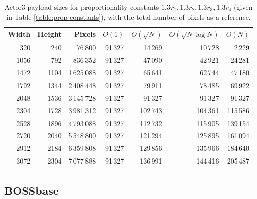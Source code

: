 \documentclass[11pt,a4paper,twoside,openright]{report}
\begin{document}
\begin{appendices}
\begin{table}[htbp]
\begin{center}
\begin{tabular}{ | r r | r | r r r r | }
\hline
Width & Height & Pixels & $O(1)$ & $O(\sqrt{N})$ & $O(\sqrt{N} \log N)$ & $O(N)$ \\ \hline
320 & 240 & 76\,800 & 91\,327 & 14\,269 & 10\,728 & 2\,229 \\
1056 & 792 & 836\,352 & 91\,327 & 47\,090 & 42\,921 & 24\,281 \\
1472 & 1104 & 1\,625\,088 & 91\,327 & 65\,641 & 62\,744 & 47\,180 \\
1792 & 1344 & 2\,408\,448 & 91\,327 & 79\,911 & 78\,485 & 69\,922 \\
2048 & 1536 & 3\,145\,728 & 91\,327 & 91\,327 & 91\,327 & 91\,327 \\
2304 & 1728 & 3\,981\,312 & 91\,327 & 102\,743 & 104\,361 & 115\,586 \\
2528 & 1896 & 4\,793\,088 & 91\,327 & 112\,732 & 115\,905 & 139\,154 \\
2720 & 2040 & 5\,548\,800 & 91\,327 & 121\,294 & 125\,895 & 161\,094 \\
2912 & 2184 & 6\,359\,808 & 91\,327 & 129\,856 & 135\,966 & 184\,640 \\
3072 & 2304 & 7\,077\,888 & 91\,327 & 136\,991 & 144\,416 & 205\,487 \\ \hline
\end{tabular}
\caption{Actor3 payload sizes for proportionality constants $1.3 r_1, 1.3 r_2, 1.3 r_3, 1.3 r_4$ (given in Table \ref{table:prop-constants}), with the total number of pixels as a reference.}
\end{center}
\end{table}


\subsection{BOSSbase}


\end{appendices}
\end{document}
